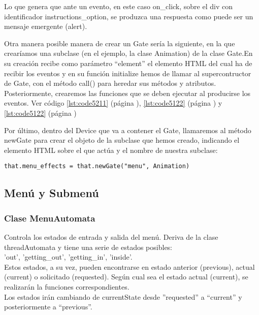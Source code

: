 Lo que genera que ante un evento, en este caso on\_click, sobre el div con identificador instructions\_option, se produzca  una respuesta como 
puede ser un mensaje emergente (alert).

Otra manera posible manera de crear un Gate sería la siguiente, en la que crearíamos una subclase (en el ejemplo, la clase Animation) de la 
clase Gate.En su creación recibe como parámetro “element” el elemento HTML del cual ha de recibir los eventos y en su función initialize hemos 
de llamar al supercontructor de Gate, con el método call() para heredar sus métodos y atributos.
Posteriormente, crearemos las funciones que se deben ejecutar al producirse los eventos. Ver código \ref{lst:code5211} 
(página \pageref{lst:code5211}), \ref{lst:code5122} (página \pageref{lst:code5122}) y \ref{lst:code5122} 
(página \pageref{lst:code5122})


Por último, dentro del Device que va a contener el Gate, llamaremos al método newGate para crear el objeto de la subclase que hemos creado, 
indicando el elemento HTML sobre el que actúa y el nombre de nuestra subclase:

\begin{verbatim}
that.menu_effects = that.newGate("menu", Animation)
\end{verbatim}


\subsection{Menú y Submenú}
\label{subsection:menu}

\subsubsection{Clase MenuAutomata}
\label{subsubsection:menu_automata}

Controla los estados de entrada y salida del menú. Deriva de la clase threadAutomata y tiene una serie de estados posibles:\\
'out', 'getting\_out', 'getting\_in', 'inside'.\\
Estos estados, a su vez, pueden encontrarse en estado anterior (previous), actual (current) o solicitado (requested). Según cual sea  el estado 
actual (current), se realizarán la funciones correspondientes.\\

Los estados irán cambiando de currentState desde ”requested” a “current” y posteriormente a “previous”.

